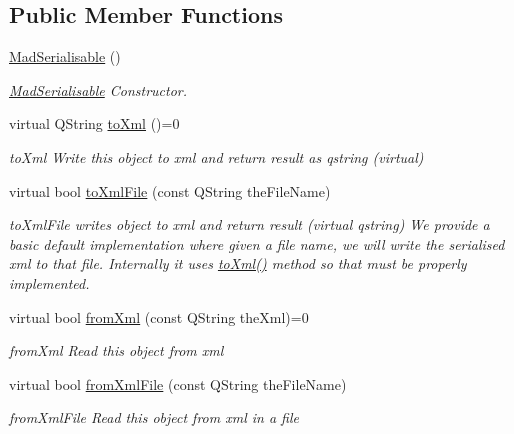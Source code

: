 \subsection*{Public Member Functions}
\begin{DoxyCompactItemize}
\item 
\hyperlink{class_mad_serialisable_aa2f63236e869cf3237cf4b31194550c5}{Mad\-Serialisable} ()
\begin{DoxyCompactList}\small\item\em \hyperlink{class_mad_serialisable}{Mad\-Serialisable} Constructor. \end{DoxyCompactList}\item 
virtual Q\-String \hyperlink{class_mad_serialisable_ad54654484660b5b0391f5e8765070ec8}{to\-Xml} ()=0
\begin{DoxyCompactList}\small\item\em to\-Xml Write this object to xml and return result as qstring (virtual) \end{DoxyCompactList}\item 
virtual bool \hyperlink{class_mad_serialisable_a59ebe72f565f96ca7cae16f4a4f100b8}{to\-Xml\-File} (const Q\-String the\-File\-Name)
\begin{DoxyCompactList}\small\item\em to\-Xml\-File writes object to xml and return result (virtual qstring) We provide a basic default implementation where given a file name, we will write the serialised xml to that file. Internally it uses \hyperlink{class_mad_serialisable_ad54654484660b5b0391f5e8765070ec8}{to\-Xml()} method so that must be properly implemented. \end{DoxyCompactList}\item 
virtual bool \hyperlink{class_mad_serialisable_a37d5fc3b08cddd05c4ddffdf3fd43535}{from\-Xml} (const Q\-String the\-Xml)=0
\begin{DoxyCompactList}\small\item\em from\-Xml Read this object from xml \end{DoxyCompactList}\item 
virtual bool \hyperlink{class_mad_serialisable_a132a3ea21578307ae1afe074acc20d47}{from\-Xml\-File} (const Q\-String the\-File\-Name)
\begin{DoxyCompactList}\small\item\em from\-Xml\-File Read this object from xml in a file \end{DoxyCompactList}\end{DoxyCompactItemize}


